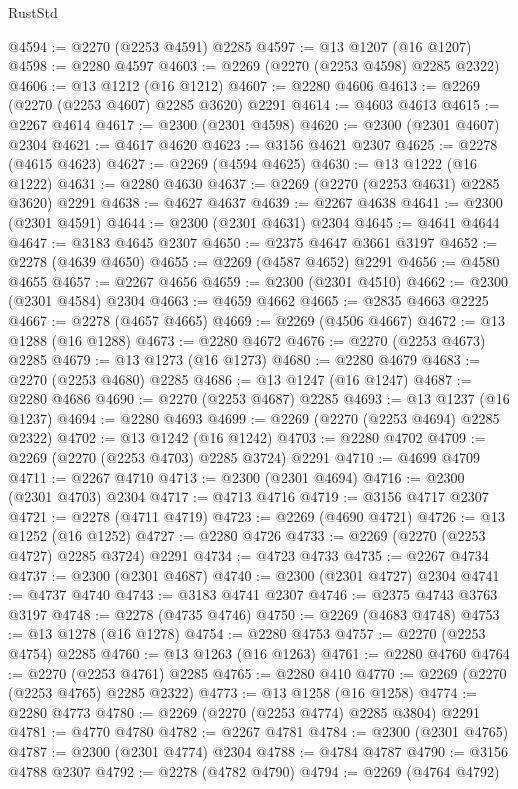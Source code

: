 \begin{lexlean}{RustStd}
\begin{coremodule}
@4594 := @2270 (@2253 @4591) @2285
@4597 := @13 @1207 (@16 @1207)
@4598 := @2280 @4597
@4603 := @2269 (@2270 (@2253 @4598) @2285 @2322)
@4606 := @13 @1212 (@16 @1212)
@4607 := @2280 @4606
@4613 := @2269 (@2270 (@2253 @4607) @2285 @3620) @2291
@4614 := @4603 @4613
@4615 := @2267 @4614
@4617 := @2300 (@2301 @4598)
@4620 := @2300 (@2301 @4607) @2304
@4621 := @4617 @4620
@4623 := @3156 @4621 @2307
@4625 := @2278 (@4615 @4623)
@4627 := @2269 (@4594 @4625)
@4630 := @13 @1222 (@16 @1222)
@4631 := @2280 @4630
@4637 := @2269 (@2270 (@2253 @4631) @2285 @3620) @2291
@4638 := @4627 @4637
@4639 := @2267 @4638
@4641 := @2300 (@2301 @4591)
@4644 := @2300 (@2301 @4631) @2304
@4645 := @4641 @4644
@4647 := @3183 @4645 @2307
@4650 := @2375 @4647 @3661 @3197
@4652 := @2278 (@4639 @4650)
@4655 := @2269 (@4587 @4652) @2291
@4656 := @4580 @4655
@4657 := @2267 @4656
@4659 := @2300 (@2301 @4510)
@4662 := @2300 (@2301 @4584) @2304
@4663 := @4659 @4662
@4665 := @2835 @4663 @2225
@4667 := @2278 (@4657 @4665)
@4669 := @2269 (@4506 @4667)
@4672 := @13 @1288 (@16 @1288)
@4673 := @2280 @4672
@4676 := @2270 (@2253 @4673) @2285
@4679 := @13 @1273 (@16 @1273)
@4680 := @2280 @4679
@4683 := @2270 (@2253 @4680) @2285
@4686 := @13 @1247 (@16 @1247)
@4687 := @2280 @4686
@4690 := @2270 (@2253 @4687) @2285
@4693 := @13 @1237 (@16 @1237)
@4694 := @2280 @4693
@4699 := @2269 (@2270 (@2253 @4694) @2285 @2322)
@4702 := @13 @1242 (@16 @1242)
@4703 := @2280 @4702
@4709 := @2269 (@2270 (@2253 @4703) @2285 @3724) @2291
@4710 := @4699 @4709
@4711 := @2267 @4710
@4713 := @2300 (@2301 @4694)
@4716 := @2300 (@2301 @4703) @2304
@4717 := @4713 @4716
@4719 := @3156 @4717 @2307
@4721 := @2278 (@4711 @4719)
@4723 := @2269 (@4690 @4721)
@4726 := @13 @1252 (@16 @1252)
@4727 := @2280 @4726
@4733 := @2269 (@2270 (@2253 @4727) @2285 @3724) @2291
@4734 := @4723 @4733
@4735 := @2267 @4734
@4737 := @2300 (@2301 @4687)
@4740 := @2300 (@2301 @4727) @2304
@4741 := @4737 @4740
@4743 := @3183 @4741 @2307
@4746 := @2375 @4743 @3763 @3197
@4748 := @2278 (@4735 @4746)
@4750 := @2269 (@4683 @4748)
@4753 := @13 @1278 (@16 @1278)
@4754 := @2280 @4753
@4757 := @2270 (@2253 @4754) @2285
@4760 := @13 @1263 (@16 @1263)
@4761 := @2280 @4760
@4764 := @2270 (@2253 @4761) @2285
@4765 := @2280 @410
@4770 := @2269 (@2270 (@2253 @4765) @2285 @2322)
@4773 := @13 @1258 (@16 @1258)
@4774 := @2280 @4773
@4780 := @2269 (@2270 (@2253 @4774) @2285 @3804) @2291
@4781 := @4770 @4780
@4782 := @2267 @4781
@4784 := @2300 (@2301 @4765)
@4787 := @2300 (@2301 @4774) @2304
@4788 := @4784 @4787
@4790 := @3156 @4788 @2307
@4792 := @2278 (@4782 @4790)
@4794 := @2269 (@4764 @4792)

\end{coremodule}
\end{lexlean}

